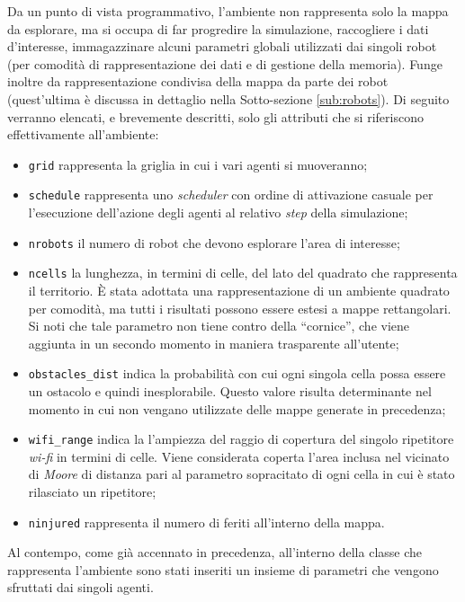 Da un punto di vista programmativo, l'ambiente non rappresenta solo la mappa da esplorare, ma si occupa di far progredire la simulazione, raccogliere i dati d'interesse, immagazzinare alcuni parametri globali utilizzati dai singoli robot (per comodità di rappresentazione dei dati e di gestione della memoria). Funge inoltre da rappresentazione condivisa della mappa da parte dei robot (quest'ultima è discussa in dettaglio nella Sotto-sezione \ref{sub:robots}).
Di seguito verranno elencati, e brevemente descritti, solo gli attributi che si riferiscono effettivamente all'ambiente:
\begin{itemize}
	\item \texttt{grid} rappresenta la griglia in cui i vari agenti si muoveranno;
	\item \texttt{schedule} rappresenta uno \textit{scheduler} con ordine di attivazione casuale per l'esecuzione dell'azione degli agenti al relativo \textit{step} della simulazione;
	\item \texttt{nrobots} il numero di robot che devono esplorare l'area di interesse;
	\item \texttt{ncells} la lunghezza, in termini di celle, del lato del quadrato che rappresenta il territorio. È stata adottata una rappresentazione di un ambiente quadrato per comodità, ma tutti i risultati possono essere estesi a mappe rettangolari. Si noti che tale parametro non tiene contro della “cornice”, che viene aggiunta in un secondo momento in maniera trasparente all'utente;
	\item \texttt{obstacles\_dist} indica la probabilità con cui ogni singola cella possa essere un ostacolo e quindi inesplorabile. Questo valore risulta determinante nel momento in cui non vengano utilizzate delle mappe generate in precedenza;
	\item \texttt{wifi\_range} indica la l'ampiezza del raggio di copertura del singolo ripetitore \textit{wi-fi} in termini di celle. Viene considerata coperta l'area inclusa nel vicinato di \textit{Moore} di distanza pari al parametro sopracitato di ogni cella in cui è stato rilasciato un ripetitore;
	\item \texttt{ninjured} rappresenta il numero di feriti all'interno della mappa.
\end{itemize}
Al contempo, come già accennato in precedenza, all'interno della classe che rappresenta l'ambiente sono stati inseriti un insieme di parametri che vengono sfruttati dai singoli agenti. 
